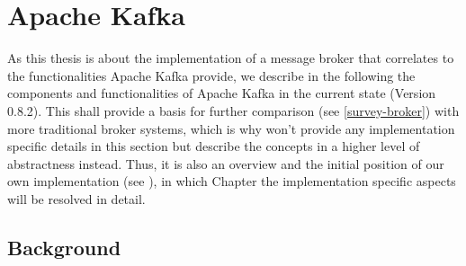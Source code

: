 \chapter{Apache Kafka}
\label{intro-kafka}

As this thesis is about the implementation of a message broker that correlates
to the functionalities Apache Kafka provide, we describe in the following the
components and functionalities of Apache Kafka in the current state (Version
0.8.2). This shall provide a basis for further comparison (see \ref{survey-broker}) with
more traditional broker systems, which is why won't provide any implementation
specific details in this section but describe the concepts in a higher level of
abstractness instead. Thus, it is also an overview and the initial position of our
own implementation (see ), in which Chapter the implementation
specific aspects will be resolved in detail. 

\section{Background}


